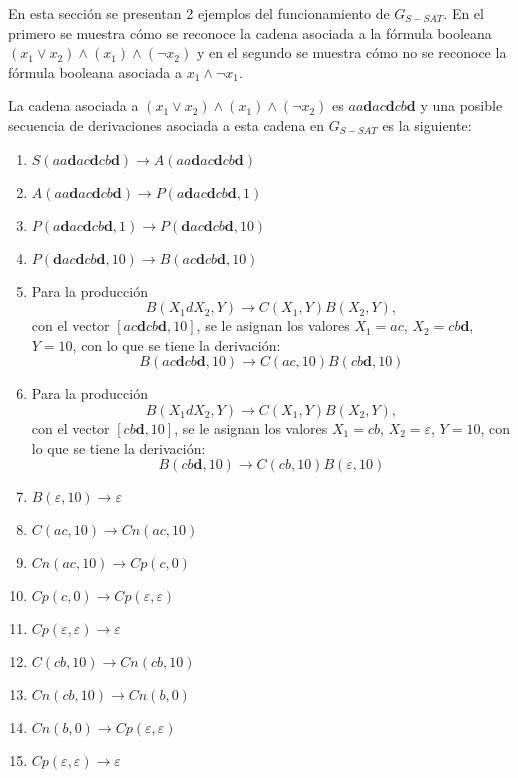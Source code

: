 En esta sección se presentan 2 ejemplos del funcionamiento de $G_{S-SAT}$. En el primero se muestra cómo se reconoce la cadena asociada a la fórmula booleana $(x_1 \vee x_2) \wedge (x_1) \wedge (\neg x_2)$ y en el segundo se muestra cómo no se reconoce la fórmula booleana asociada a $x_1 \wedge \neg x_1$.

La cadena asociada a $(x_1 \vee x_2) \wedge (x_1) \wedge (\neg x_2)$ es $aa\mathbf{d}ac\mathbf{d}cb\mathbf{d}$ y una posible secuencia de derivaciones
asociada a esta cadena en $G_{S-SAT}$ es la siguiente:

\begin{enumerate}
    \item $S(aa\mathbf{d}ac\mathbf{d}cb\mathbf{d})\to A(aa\mathbf{d}ac\mathbf{d}cb\mathbf{d})$
    \item $A(aa\mathbf{d}ac\mathbf{d}cb\mathbf{d})\to P(a\mathbf{d}ac\mathbf{d}cb\mathbf{d},1)$
    \item $P(a\mathbf{d}ac\mathbf{d}cb\mathbf{d},1)\to P(\mathbf{d}ac\mathbf{d}cb\mathbf{d},10)$
    \item $P(\mathbf{d}ac\mathbf{d}cb\mathbf{d},10)\to B(ac\mathbf{d}cb\mathbf{d}, 10)$
    \item Para la producción $$B(X_1dX_2,Y)\to C(X_1,Y) B(X_2,Y),$$ con el vector $[ac\mathbf{d}cb\mathbf{d}, 10]$,
          se le asignan los valores $X_1=ac$, $X_2=cb\mathbf{d}$, $Y=10$, con lo que se tiene la derivación:
          $$B(ac\mathbf{d}cb\mathbf{d}, 10)\to C(ac,10) B(cb\mathbf{d},10)$$
    \item Para la producción $$B(X_1dX_2,Y)\to C(X_1,Y) B(X_2,Y),$$ con el vector $[cb\mathbf{d},10]$,
          se le asignan los valores $X_1=cb$, $X_2=\varepsilon$, $Y=10$, con lo que se tiene la derivación:
          $$B(cb\mathbf{d},10)\to C(cb,10) B(\varepsilon,10)$$
    \item $B(\varepsilon,10)\to \varepsilon$
    \item $C(ac,10)\to Cn(ac,10)$
    \item $Cn(ac,10)\to Cp(c,0)$
    \item $Cp(c,0)\to Cp(\varepsilon,\varepsilon)$
    \item $Cp(\varepsilon, \varepsilon) \to \varepsilon$
    \item $C(cb,10)\to Cn(cb,10)$
    \item $Cn(cb,10)\to Cn(b,0)$
    \item $Cn(b,0)\to Cp(\varepsilon,\varepsilon)$
    \item $Cp(\varepsilon, \varepsilon) \to \varepsilon$
\end{enumerate}

